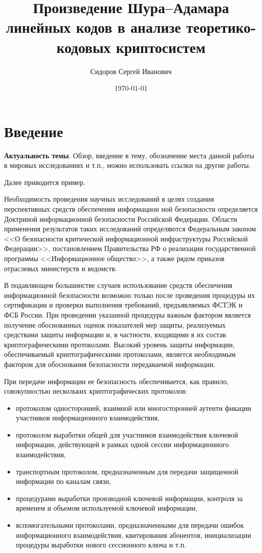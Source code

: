 \documentclass[12pt]{extarticle}
\author{Сидоров Сергей Иванович}
\date{\today}
\title{Произведение Шура--Адамара линейных кодов в анализе теоретико-кодовых криптосистем}
\begin{document}
\maketitle
\section*{Введение}
\label{sec:org077d81c}

\textbf{Актуальность темы}.
Обзор, введение в тему, обозначение места данной работы в мировых исследованиях и т.п., можно использовать ссылки на другие
работы.

Далее приводится пример.

Необходимость проведения научных исследований в целях создания перспективных средств обеспечения информацион ной безопасности определяется Доктриной информационной безопасности Российской Федерации.
Области применения результатов таких исследований определяются Федеральным законом {}<<О безопасности критической информационной инфраструктуры Российской Федерации>>{}, постановлением Правительства РФ о реализации государственной программы {}<<Информационное общество>>{}, а также рядом приказов отраслевых министерств и ведомств.

В подавляющем большинстве случаев использование средств обеспечения информационной безопасности возможно только после проведения процедуры их сертификации и проверки выполнения требований, предъявляемых ФСТЭК и ФСБ России.
При проведении указанной процедуры важным фактором является получение обоснованных оценок показателей мер защиты, реализуемых средствами защиты информации и, в частности, входящими в их состав криптографическими протоколами.
Высокий уровень защиты информации, обеспечиваемый криптографическими протоколами, является необходимым фактором для обоснования безопасности передаваемой информации.

При передаче информации ее безопасность обеспечивается, как правило, совокупностью нескольких криптографических протоколов:
\begin{itemize}
\item протоколом односторонней, взаимной или многосторонней аутенти фикации участников информационного взаимодействия,
\item протоколом выработки общей для участников взаимодействия ключевой информации, действующей в рамках одной сессии информационного взаимодействия,
\item транспортным протоколом, предназначенным для передачи защищенной информации по каналам связи,
\item процедурами выработки производной ключевой информации, контроля за временем и объемом используемой ключевой информации,
\item вспомогательными протоколами, предназначенными для передачи ошибок информационного взаимодействия, квитирования абонентов, инициализации процедуры выработки нового сессионного ключа и т.п.
\end{itemize}
\end{document}

